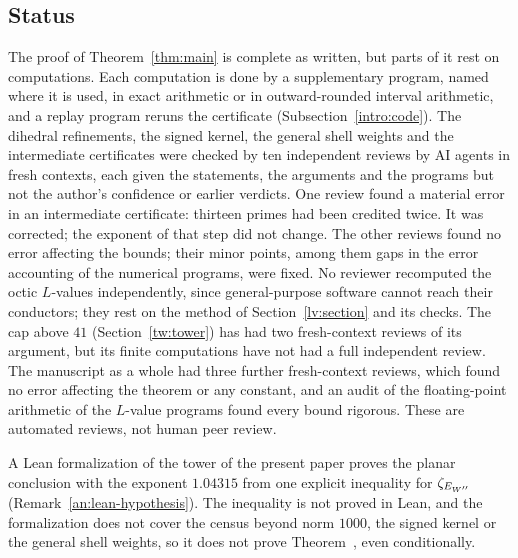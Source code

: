 \subsection{Status}\label{intro:status}
The proof of Theorem~\ref{thm:main} is complete as written, but parts of
it rest on computations. Each computation is done by a supplementary
program, named where it is used, in exact arithmetic or in outward-rounded
interval arithmetic, and a replay program reruns the certificate
(Subsection~\ref{intro:code}). The dihedral refinements, the signed
kernel, the general shell weights and the intermediate certificates were
checked by ten independent reviews by AI agents in fresh contexts, each
given the statements, the arguments and the programs but not the author's
confidence or earlier verdicts. One review
found a material error in an intermediate certificate: thirteen primes
had been credited twice. It was corrected; the exponent of that step did
not change. The other reviews found no error affecting the bounds; their
minor points, among them gaps in the error accounting of the numerical
programs, were fixed. No reviewer recomputed the octic $L$-values
independently, since general-purpose software cannot reach their
conductors; they rest on the method of Section~\ref{lv:section} and its
checks. The cap above $41$ (Section~\ref{tw:tower}) has had two
fresh-context reviews of its argument, but its finite computations have
not had a full independent review. The manuscript as a whole had three
further fresh-context reviews, which found no error affecting the theorem
or any constant, and an audit of the floating-point arithmetic of the
$L$-value programs found every bound rigorous. These are
automated reviews, not human peer review.

A Lean formalization \cite{NaslundLeanW} of the tower of the present
paper proves the planar conclusion with the exponent $1.04315$ from one
explicit inequality for $\zeta_{E_{W''}}$ (Remark~\ref{an:lean-hypothesis}).
The inequality is not proved in Lean, and the formalization does not cover
the census beyond norm $1000$, the signed kernel or the general shell
weights, so it does not prove Theorem~, even
conditionally.

